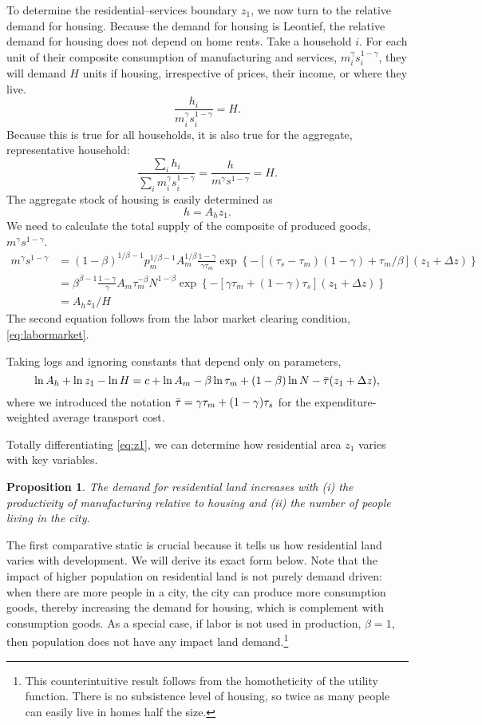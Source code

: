 \documentclass[12pt]{article}
\newtheorem{proposition}{Proposition}
\begin{document}
To determine the residential--services boundary $z_1$, we now turn to the relative demand for housing. Because the demand for housing is Leontief, the relative demand for housing does not depend on home rents. Take a household $i$. For each unit of their composite consumption of manufacturing and services, $m_i^\gamma s_i^{1-\gamma}$, they will demand $H$ units if housing, irrespective of prices, their income, or where they live.
\[
 \frac{h_i}{m_i^\gamma s_i^{1-\gamma}} = H.
\]
Because this is true for all households, it is also true for the aggregate, representative household:
\[
 \frac{\sum_{i}h_i}{\sum_i m_i^\gamma s_i^{1-\gamma}} =\frac{h}{m^\gamma s^{1-\gamma}}= H.
\]
The aggregate stock of housing is easily determined as
\[
 h = A_h z_1.
\]
We need to calculate the total supply of the composite of produced goods, $m^\gamma s^{1-\gamma}$.
\begin{align}
 m^\gamma s^{1-\gamma} &= (1-\beta)^{1/\beta-1} p_m^{1/\beta-1} A_m^{1/\beta} \frac{1-\gamma}{\gamma\tau_m}
\exp\left\{
-[(\tau_s-\tau_m)(1-\gamma)+\tau_m/\beta](z_1+\Delta z)
\right\}\\
&=\beta^{\beta-1}\frac{1-\gamma}{\gamma}A_m\tau_m^{-\beta} N^{1-\beta}
\exp\left\{
-[\gamma\tau_m+(1-\gamma)\tau_s](z_1+\Delta z)
\right\}\\
&= A_hz_1/H
\end{align}
The second equation follows from the labor market clearing condition, \eqref{eq:labormarket}.

Taking logs and ignoring constants that depend only on parameters,
\begin{equation}\label{eq:z1}
 \ln A_h +\ln z_1 - \ln H =
c+\ln A_m-\beta\ln\tau_m+(1-\beta)\ln N
-\Bar\tau(z_1+\Delta z),
\end{equation}
where we introduced the notation $\Bar\tau = \gamma\tau_m+(1-\gamma)\tau_s$ for the expenditure-weighted average transport cost.

Totally differentiating \eqref{eq:z1}, we can determine how residential area $z_1$ varies with key variables.
\begin{proposition}\label{prop:residential}
 The demand for residential land increases with (i) the productivity of manufacturing relative to housing and (ii) the number of people living in the city.
\end{proposition}
The first comparative static is crucial because it tells us how residential land varies with development. We will derive its exact form below. Note that the impact of higher population on residential land is not purely demand driven: when there are more people in a city, the city can produce more consumption goods, thereby increasing the demand for housing, which is complement with consumption goods. As a special case, if labor is not used in production, $\beta=1$, then population does not have any impact land demand.\footnote{This counterintuitive result follows from the homotheticity of the utility function. There is no subsistence level of housing, so twice as many people can easily live in homes half the size.}
\end{document}
